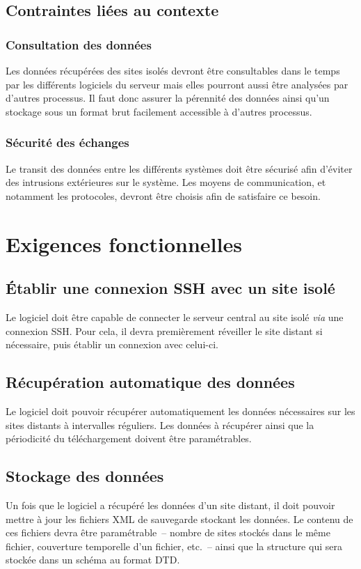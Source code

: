 \documentclass[a4paper, 11pt, final]{article}
\begin{document}
\subsection{Contraintes liées au contexte}

\subsubsection{Consultation des données}
Les données récupérées des sites isolés devront être consultables dans le temps par les différents logiciels
du serveur mais elles pourront aussi être analysées par d'autres processus. Il faut donc assurer la
pérennité des données ainsi qu'un stockage sous un format brut facilement accessible à d'autres processus.

\subsubsection{Sécurité des échanges}
Le transit des données entre les différents systèmes doit être sécurisé afin d'éviter des intrusions extérieures
sur le système. Les moyens de communication, et notamment les protocoles, devront être choisis afin de satisfaire
ce besoin.

\section{Exigences fonctionnelles}

\subsection{Établir une connexion SSH avec un site isolé}
Le logiciel doit être capable de connecter le serveur central au site isolé \emph{via}
une connexion SSH. Pour cela, il devra premièrement réveiller le site distant si nécessaire,
puis établir un connexion avec celui-ci.

\subsection{Récupération automatique des données}
Le logiciel doit pouvoir récupérer automatiquement les données nécessaires sur
les sites distants à intervalles réguliers.
Les données à récupérer ainsi que la périodicité du téléchargement doivent être paramétrables.

\subsection{Stockage des données}
Un fois que le logiciel a récupéré les données d'un site distant, il doit pouvoir mettre
à jour les fichiers XML de sauvegarde stockant les données. Le contenu de ces fichiers
devra être paramétrable~-- nombre de sites stockés dans le même fichier, couverture temporelle
d'un fichier, etc.~-- ainsi que la structure qui sera stockée dans un schéma au format DTD.
\end{document}

